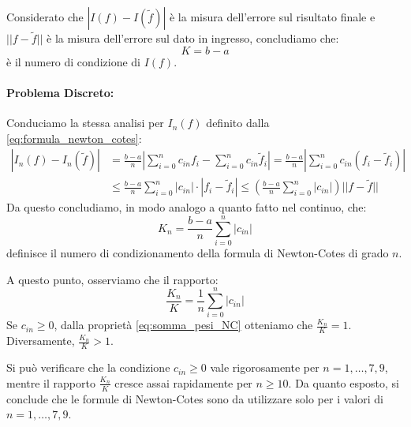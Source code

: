 Considerato che $|I(f) - I(\tilde{f})|$ è la misura dell'errore sul risultato finale e $||f - \tilde{f}||$ è la misura dell'errore sul dato in ingresso, concludiamo che:
\begin{equation} \label{eq:condizione_continuo}
K = b-a
\end{equation}
è il numero di condizione di $I(f)$.

\paragraph{Problema Discreto:} Conduciamo la stessa analisi per $I_n(f)$ definito dalla \eqref{eq:formula_newton_cotes}:
\begin{align*}
|I_n(f) - I_n(\tilde{f})| &= \frac{b-a}{n} \left| \sum_{i=0}^{n} c_{in} f_i - \sum_{i=0}^{n} c_{in} \tilde{f}_i \right| = \frac{b-a}{n} \left| \sum_{i=0}^{n} c_{in} (f_i - \tilde{f}_i) \right| \\
&\le \frac{b-a}{n} \sum_{i=0}^{n} |c_{in}| \cdot |f_i - \tilde{f}_i| \le \left( \frac{b-a}{n} \sum_{i=0}^{n} |c_{in}| \right) ||f - \tilde{f}||
\end{align*}
Da questo concludiamo, in modo analogo a quanto fatto nel continuo, che:
\begin{equation} \label{eq:condizione_discreto}
K_n = \frac{b-a}{n} \sum_{i=0}^{n} |c_{in}|
\end{equation}
definisce il numero di condizionamento della formula di Newton-Cotes di grado $n$.

A questo punto, osserviamo che il rapporto:
\begin{equation}
\frac{K_n}{K} = \frac{1}{n} \sum_{i=0}^{n} |c_{in}|
\end{equation}
Se $c_{in} \ge 0$, dalla proprietà \eqref{eq:somma_pesi_NC} otteniamo che $\frac{K_n}{K} = 1$.
Diversamente, $\frac{K_n}{K} > 1$.

Si può verificare che la condizione $c_{in} \ge 0$ vale rigorosamente per $n = 1, \dots,7, 9$, mentre il rapporto $\frac{K_n}{K}$ cresce assai rapidamente per $n \ge 10$.
Da quanto esposto, si conclude che le formule di Newton-Cotes sono da utilizzare solo per i valori di $n = 1, \dots,7, 9$.

